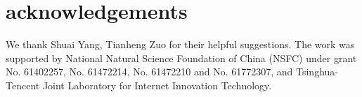 \section{acknowledgements}
\label{acknowledgements}
We thank Shuai Yang, Tianheng Zuo for their helpful suggestions.
The work was supported by National Natural Science Foundation of China (NSFC) under grant No. 61402257, No. 61472214, No. 61472210 and No. 61772307, and Tsinghua-Tencent Joint Laboratory for Internet Innovation Technology.